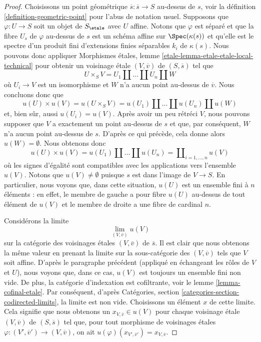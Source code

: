 \begin{proof}
\medskip\noindent
Choisissons un point g\'eom\'etrique $\overline{s} : \overline{s} \to S$ au-dessus de $s$, voir la
d\'efinition \ref{definition-geometric-point}
pour l'abus de notation usuel. Supposons que $\varphi : U \to S$ soit un objet
de $S_\etale$ avec $U$ affine. Notons que $\varphi$ est s\'epar\'e et
que la fibre $U_s$ de $\varphi$ au-dessus de $s$ est un sch\'ema affine sur
$\Spec(\kappa(s))$ et qu'elle est le spectre d'un produit fini
d'extensions finies s\'eparables $k_i$ de $\kappa(s)$. Nous pouvons donc appliquer
Morphismes étales, lemme \ref{etale-lemma-etale-etale-local-technical}
pour obtenir un voisinage \'etale $(V, \overline{v})$ de $(S, \overline{s})$
tel que
$$
U \times_S V = U_1 \amalg \ldots \amalg U_n \amalg W
$$
o\`u $U_i \to V$ est un isomorphisme et $W$ n'a aucun point au-dessus de
$\overline{v}$. Nous concluons donc que
$$
u(U) \times u(V) =
u(U \times_S V) =
u(U_1) \amalg \ldots \amalg u(U_n) \amalg u(W)
$$
et, bien s\^ur, aussi $u(U_i) = u(V)$. Apr\`es avoir un peu r\'etr\'eci $V$, nous pouvons
supposer que $V$ a exactement un point au-dessus de $s$ et que, par cons\'equent, $W$ n'a aucun
point au-dessus de $s$. D'apr\`es ce qui pr\'ec\`ede, cela donne alors $u(W) = \emptyset$.
Nous obtenons donc
$$
u(U) \times u(V) =
u(U_1) \amalg \ldots \amalg u(U_n) =
\coprod\nolimits_{i = 1, \ldots, n} u(V)
$$
o\`u les signes d'\'egalit\'e sont compatibles avec les applications vers l'ensemble $u(V)$.
Notons que $u(V) \not = \emptyset$ puisque $s$ est dans l'image de $V \to S$.
En particulier, nous voyons que, dans cette situation, $u(U)$ est un
ensemble fini \`a $n$ \'el\'ements : en effet, le membre de gauche a pour fibre $u(U)$ au-dessus de
tout \'el\'ement de $u(V)$ et le membre de droite a une fibre de cardinal $n$.

\medskip\noindent
Consid\'erons la limite
$$
\lim_{(V, \overline{v})} u(V)
$$
sur la cat\'egorie des voisinages \'etales $(V, \overline{v})$ de
$\overline{s}$. Il est clair que nous obtenons la m\^eme valeur en prenant
la limite sur la sous-cat\'egorie des $(V, \overline{v})$ tels que $V$ soit affine.
D'apr\`es le paragraphe pr\'ec\'edent (appliqu\'e en \'echangeant les r\^oles de $V$ et $U$),
nous voyons que, dans ce cas, $u(V)$ est toujours un ensemble fini non vide.
De plus, la cat\'egorie d'indexation est cofiltrante, voir le
lemme \ref{lemma-cofinal-etale}.
Par cons\'equent, d'apr\`es
Catégories, section \ref{categories-section-codirected-limits},
la limite est non vide. Choisissons un \'el\'ement $x$ de cette limite.
Cela signifie que nous obtenons un $x_{V, \overline{v}} \in u(V)$ pour
chaque voisinage \'etale $(V, \overline{v})$ de $(S, \overline{s})$
tel que, pour tout morphisme de voisinages \'etales
$\varphi : (V', \overline{v}') \to (V, \overline{v})$, on ait
$u(\varphi)(x_{V', \overline{v}'}) = x_{V, \overline{v}}$.


\end{proof}
